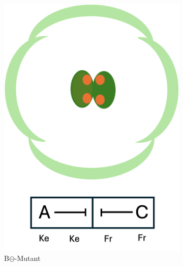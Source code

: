 \documentclass[10pt,a4paper]{article}
\begin{document}
\begin{figure}[H]
\begin{subfigure}[b]{0.3\textwidth}
				\includegraphics[width=\textwidth]{B-Mutant_diagramm.png}
				\caption{B$\ominus$-Mutant}
				\label{fig:B-Mutant}
			\end{subfigure}
			\hfill
			\begin{subfigure}[b]{0.3\textwidth}

\end{subfigure}
\end{figure}
\end{document}
